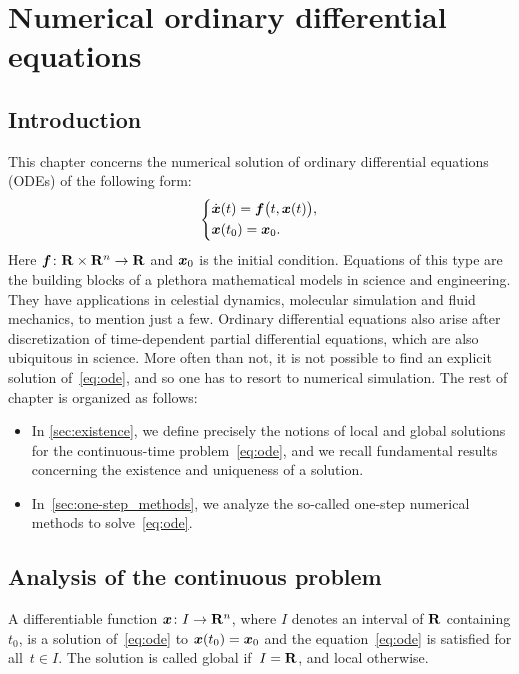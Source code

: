 \chapter{Numerical ordinary differential equations}
\label{cha:odep}
\minitoc

\section*{Introduction}
This chapter concerns the numerical solution of ordinary differential equations (ODEs) of the following form:
\begin{equation}
    \label{eq:ode}
    \left \{
    \begin{aligned}
        & \dot {\mathbf{\boldsymbol{x}}}(t) = \mathbf{\boldsymbol{f}}\bigl(t, \mathbf{\boldsymbol{x}}(t)\bigr), \\
        & \mathbf{\boldsymbol{x}}(t_0) = \mathbf{\boldsymbol{x}}_0.
    \end{aligned}
    \right.
\end{equation}
Here $\mathbf{\boldsymbol{f}}\colon \mathbf R \times \mathbf R^n \to \mathbf R$ and $\mathbf{\boldsymbol{x}}_0$ is the initial condition.
Equations of this type
are the building blocks of a plethora mathematical models in science and engineering.
They have applications in celestial dynamics, molecular simulation and fluid mechanics, to mention just a few.
Ordinary differential equations also arise after discretization of time-dependent partial differential equations,
which are also ubiquitous in science.
More often than not,
it is not possible to find an explicit solution of~\eqref{eq:ode},
and so one has to resort to numerical simulation.
The rest of chapter is organized as follows:
\begin{itemize}
    \item
        In \cref{sec:existence},
        we define precisely the notions of local and global solutions for the continuous-time problem~\eqref{eq:ode},
        and we recall fundamental results concerning the existence and uniqueness of a solution.

    \item
        In~\cref{sec:one-step_methods},
        we analyze the so-called one-step numerical methods to solve~\eqref{eq:ode}.
\end{itemize}

\section{Analysis of the continuous problem}
A differentiable function $\mathbf{\boldsymbol{x}}\colon I \to \mathbf R^n$,
where $I$ denotes an interval of $\mathbf R$ containing $t_0$,
is a solution of~\eqref{eq:ode} to $\mathbf{\boldsymbol{x}}(t_0) = \mathbf{\boldsymbol{x}}_0$ and the equation~\eqref{eq:ode} is satisfied for all~$t \in I$.
The solution is called global if~$I = \mathbf R$,
and local otherwise.


